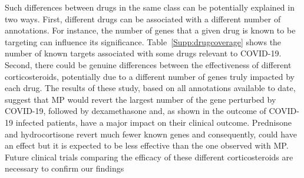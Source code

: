 Such differences between drugs in the same class can be potentially explained in two ways. First, different drugs can be associated with a different number of annotations. For instance, the number of genes that a given drug is known to be targeting can influence its significance. Table~\ref{Supp:drugcoverage} shows the number of known targets associated with some drugs relevant to COVID-19. Second, there could be genuine differences between the effectiveness of different corticosteroids, potentially due to a different number of genes truly impacted by each drug. The results of these study, based on all annotations available to date, suggest that MP would revert the largest number of the gene perturbed by COVID-19, followed by dexamethasone and, as shown in the outcome of COVID-19 infected patients, have a major impact on their clinical outcome. Prednisone and hydrocortisone revert much fewer known genes and consequently, could have an effect but it is expected to be less effective than the one observed with MP.  Future clinical trials comparing the efficacy of these different corticosteroids are necessary to confirm our findings


